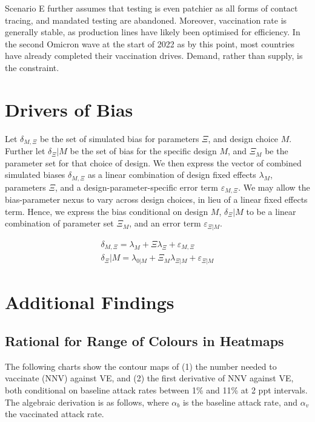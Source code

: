 \documentclass[12pt]{article}
\begin{document}
Scenario E further assumes that testing is even patchier as all forms of contact tracing, and mandated testing are abandoned. Moreover, vaccination rate is generally stable, as production lines have likely been optimised for efficiency. In the second Omicron wave at the start of 2022 as by this point, most countries have already completed their vaccination drives. Demand, rather than supply, is the constraint.

\section{Drivers of Bias}

Let $\delta_{M, \Xi}$ be the set of simulated bias for parameters $\Xi$, and design choice $M$. Further let $\delta_{\Xi} | M$ be the set of bias for the specific design $M$, and $\Xi_M$ be the parameter set for that choice of design. We then express the vector of combined simulated biases $\delta_{M, \Xi}$ as a linear combination of design fixed effects $\lambda_M$, parameters $\Xi$, and a design-parameter-specific error term $\varepsilon_{M, \Xi}$. We may allow the bias-parameter nexus to vary across design choices, in lieu of a linear fixed effects term. Hence, we express the bias conditional on design $M$, $\delta_{\Xi} | M$ to be a linear combination of parameter set $\Xi_M$, and an error term $\varepsilon_{\Xi | M}$.

\begin{eqnarray}
	\delta_{M, \Xi} = \lambda_M + \Xi \lambda_\Xi + \varepsilon_{M, \Xi} \\ 
	\delta_{\Xi} | M = \lambda_{0 | M} + \Xi_M \lambda_{\Xi | M} + \varepsilon_{\Xi | M}
\end{eqnarray}

\section{Additional Findings}
\subsection{Rational for Range of Colours in Heatmaps}
The following charts show the contour maps of (1) the number needed to vaccinate (NNV) against VE, and (2) the first derivative of NNV against VE, both conditional on baseline attack rates between 1\% and 11\% at 2 ppt intervals. The algebraic derivation is as follows, where $\alpha_{b}$ is the baseline attack rate, and $\alpha_{v}$ the vaccinated attack rate.
\end{document}
